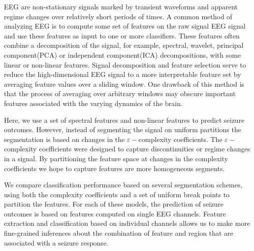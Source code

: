 EEG are non-stationary signals 
marked by transient waveforms and 
apparent regime changes over relatively short periods of times.
A common method of analyzing EEG is to compute 
some set of features on the raw signal EEG signal
and use these features as input to one or more classifiers. 
These features often combine a decomposition 
of the signal, for example, spectral, wavelet, principal component(PCA) or independent component(ICA) decompositions, with 
some linear or non-linear features\cite{alotaiby2014}.
Signal decomposition and feature selection
serve to reduce the high-dimensional 
EEG signal to a more interpretable feature set by 
averaging feature values over a sliding window.
One drawback of this method is that the process of averaging over arbitrary windows may obscure important 
features associated with the varying dynamics of the brain. 


Here, we use a set of spectral features and 
non-linear features to predict seizure outcomes. 
However, instead of segmenting the signal on uniform partitions
the segmentation is based on changes in the $\varepsilon-$complexity coefficients.
The $\varepsilon-$complexity coefficients were designed to 
capture discontinuities or regime changes in a signal. By 
partitioning the feature space at changes in the 
complexity coefficients we hope to capture features are 
more homogeneous segments. 

We compare classification performance based on 
several segmentation schemes, using both the complexity coefficients 
and a set of uniform break points to partition the features.
For each of these models, the prediction of seizure outcomes 
is based on features computed on single EEG channels.
Feature extraction and classification based on individual channels allows us to make more fine-grained inferences about the combination of feature and region that are associated with a seizure response.




